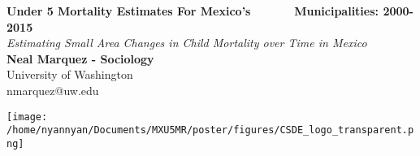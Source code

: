 \documentclass[a0,portrait]{a0poster}
\begin{document}


\begin{minipage}[b]{0.67\linewidth}
\veryHuge \color{Crimson} \textbf{Under 5 Mortality Estimates For Mexico's ~~~~~~Municipalities: 2000-2015} \color{Black}\\ %
\Huge\textit{Estimating Small Area Changes in Child Mortality over Time in Mexico}\\[2cm] %
\huge \textbf{Neal Marquez - Sociology}\\[0.5cm] %
\huge University of Washington\\[0.4cm] %
\Large nmarquez@uw.edu\\
\end{minipage}
%
\begin{minipage}[b]{0.33\linewidth}
\texttt{[image: /home/nyannyan/Documents/MXU5MR/poster/figures/CSDE\_logo\_transparent.png]}\\
\end{minipage}

\vspace{1cm} %



\end{document}
